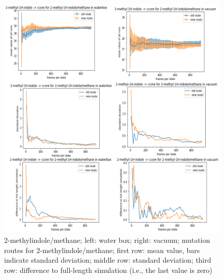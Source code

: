\begin{figure}[!htb]
	
	\includegraphics[scale=0.9]{methylindole_short}\caption{2-methylindole/methane; left: water box; right: vacuum; mutation routes for 2-methylindole/methane; first row: mean value, bars indicate standard deviation; middle row: standard deviation; third row: difference to full-length simulation (i.e., the last value is zero)}
	\label{fig:methylindole_short}
\end{figure}

